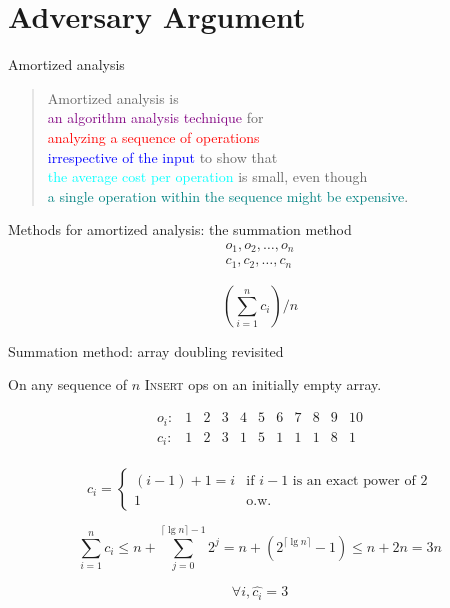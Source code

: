 \section{Adversary Argument}

\begin{frame}{Amortized analysis}
  \begin{quote}
	Amortized analysis is \\
	\textcolor{purple}{an algorithm analysis technique} for \\ 
    \textcolor{red}{analyzing a sequence of operations} \\
	\textcolor{blue}{irrespective of the input} to show that \\
    \textcolor{cyan}{the average cost per operation} is small, even though \\ 
    \textcolor{teal}{a single operation within the sequence might be expensive}.
  \end{quote}
\end{frame}
\begin{frame}{Methods for amortized analysis: the summation method}
  \begin{gather*}
	o_1, o_2, \ldots, o_n \\[5pt]
	c_1, c_2, \ldots, c_n
  \end{gather*}

  \pause
  \[
	(\sum_{i = 1}^{n} c_i) / n
  \]
\end{frame}
\begin{frame}{Summation method: array doubling revisited}
  \centerline{On any sequence of $n$ \textsc{Insert} ops on an initially empty array.}

  \pause
  \[
    \begin{array}{ccccccccccc}
      o_i: 	& 1 & 2 & 3 & 4 & 5 & 6 & 7 & 8 & 9 & 10 \\
      c_i:  & 1 & 2 & 3 & 1 & 5 & 1 & 1 & 1 & 8 & 1  \\
    \end{array}
  \]

  \pause
  \begin{displaymath}
	c_i = \left\{ \begin{array}{ll}
	  (i-1)+1 = i & \textrm{if $i - 1$ is an exact power of 2}\\
	  1 & \textrm{o.w.}
	\end{array} \right.
  \end{displaymath}

  \pause
  \[
	\sum_{i=1}^{n} c_i \le n + \sum_{j=0}^{\lceil \lg n \rceil - 1} 2^{j} = n +
	(2^{\lceil \lg n \rceil} - 1) \le n + 2n = 3n
  \]

  \pause
  \[
	\forall i, \hat{c_i} = 3
  \]
\end{frame}
